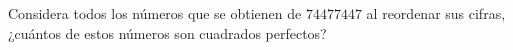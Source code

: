 Considera todos los números que se obtienen de $74477447$ al reordenar sus cifras, ¿cuántos de estos números son cuadrados perfectos?